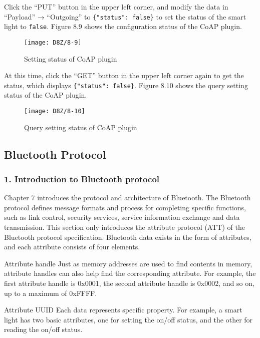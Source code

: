 \documentclass[a4paper,12pt]{book}
\begin{document}
Click the “PUT” button in the upper left corner, and modify the data in “Payload” → “Outgoing” to \verb|{"status": false}| to set the status of the smart light to \verb|false|. Figure 8.9 shows the configuration status of the CoAP plugin.

\begin{figure}[!h]
    \centering
    \texttt{[image: D8Z/8-9]}
    \caption{Setting status of CoAP plugin}
\end{figure}

At this time, click the “GET” button in the upper left corner again to get the status, which displays \verb|{"status": false}|. Figure 8.10 shows the query setting status of the CoAP plugin.

\begin{figure}[!h]
    \centering
    \texttt{[image: D8Z/8-10]}
    \caption{Query setting status of CoAP plugin}
\end{figure}

\subsection{Bluetooth Protocol}
\subsubsection{1. Introduction to Bluetooth protocol}
Chapter 7 introduces the protocol and architecture of Bluetooth. The Bluetooth protocol defines message formats and process for completing specific functions, such as link control, security services, service information exchange and data transmission. This section only introduces the attribute protocol (ATT) of the Bluetooth protocol specification. Bluetooth data exists in the form of attributes, and each attribute consists of four elements.

\begin{term}{Attribute handle}
    Just as memory addresses are used to find contents in memory, attribute handles can also help find the corresponding attribute. For example, the first attribute handle is 0x0001, the second attribute handle is 0x0002, and so on, up to a maximum of 0xFFFF.
\end{term}

\begin{term}{Attribute UUID}
    Each data represents specific property. For example, a smart light has two basic attributes, one for setting the on/off status, and the other for reading the on/off status.
\end{term}
\end{document}

